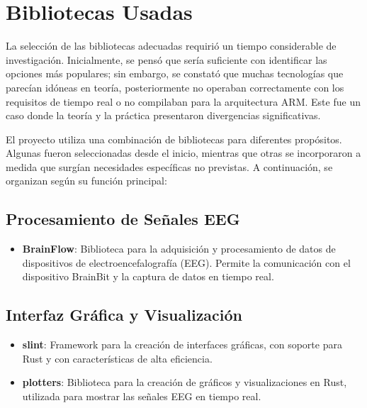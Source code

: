 \newpage

\section{Bibliotecas Usadas}

La selección de las bibliotecas adecuadas requirió un tiempo considerable de investigación. Inicialmente, se pensó que sería suficiente con identificar las opciones más populares; sin embargo, se constató que muchas tecnologías que parecían idóneas en teoría, posteriormente no operaban correctamente con los requisitos de tiempo real o no compilaban para la arquitectura ARM. Este fue un caso donde la teoría y la práctica presentaron divergencias significativas.

El proyecto utiliza una combinación de bibliotecas para diferentes propósitos. Algunas fueron seleccionadas desde el inicio, mientras que otras se incorporaron a medida que surgían necesidades específicas no previstas. A continuación, se organizan según su función principal:

\subsection{Procesamiento de Señales EEG}
\begin{itemize}
    \item \textbf{BrainFlow}: Biblioteca para la adquisición y procesamiento de datos de dispositivos de electroencefalografía (EEG). Permite la comunicación con el dispositivo BrainBit y la captura de datos en tiempo real.
\end{itemize}

\subsection{Interfaz Gráfica y Visualización}
\begin{itemize}
    \item \textbf{slint}: Framework para la creación de interfaces gráficas, con soporte para Rust y con características de alta eficiencia.
    \item \textbf{plotters}: Biblioteca para la creación de gráficos y visualizaciones en Rust, utilizada para mostrar las señales EEG en tiempo real.
\end{itemize}

